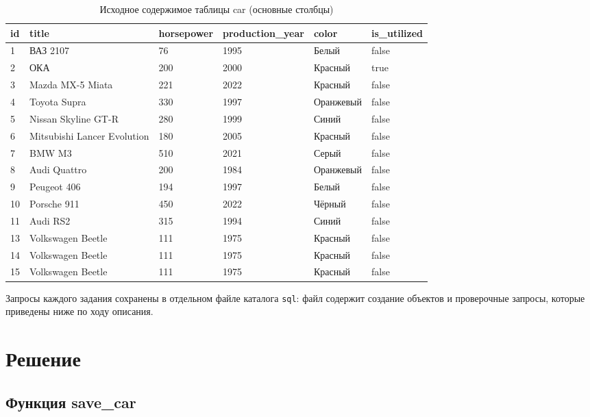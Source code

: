 \documentclass[oneside,a4paper,14pt]{extarticle}
\begin{document}
\begin{table}[H]
\centering
\footnotesize
\caption{Исходное содержимое таблицы car (основные столбцы)}\label{tab:car0}
\begin{tabular}{|l|l|l|l|l|l|}
\hline
\textbf{id} & \textbf{title} & \textbf{horsepower} & \textbf{production\_\allowbreak year} & \textbf{color} & \textbf{is\_\allowbreak utilized} \\ \hline
1 & ВАЗ 2107 & 76 & 1995 & Белый & false \\ \hline
2 & ОКА & 200 & 2000 & Красный & true \\ \hline
3 & Mazda MX-5 Miata & 221 & 2022 & Красный & false \\ \hline
4 & Toyota Supra & 330 & 1997 & Оранжевый & false \\ \hline
5 & Nissan Skyline GT-R & 280 & 1999 & Синий & false \\ \hline
6 & Mitsubishi Lancer Evolution & 180 & 2005 & Красный & false \\ \hline
7 & BMW M3 & 510 & 2021 & Серый & false \\ \hline
8 & Audi Quattro & 200 & 1984 & Оранжевый & false \\ \hline
9 & Peugeot 406 & 194 & 1997 & Белый & false \\ \hline
10 & Porsche 911 & 450 & 2022 & Чёрный & false \\ \hline
11 & Audi RS2 & 315 & 1994 & Синий & false \\ \hline
13 & Volkswagen Beetle & 111 & 1975 & Красный & false \\ \hline
14 & Volkswagen Beetle & 111 & 1975 & Красный & false \\ \hline
15 & Volkswagen Beetle & 111 & 1975 & Красный & false \\ \hline
\end{tabular}
\end{table}

Запросы каждого задания сохранены в отдельном файле каталога \texttt{sql}: файл содержит создание объектов и проверочные запросы, которые приведены ниже по ходу описания.

\newpage
\section{Решение}

\subsection{Функция save\_car}
\end{document}
